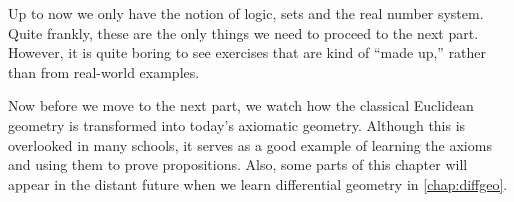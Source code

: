 \label{chap:basicgeo}

Up to now we only have the notion of
logic,
sets
and the real number system.
Quite frankly,
these are the only things we need
to proceed to the next part.
However,
it is quite boring to see exercises that are kind of ``made up,''
rather than from real-world examples.

Now before we move to the next part,
we watch how the classical Euclidean geometry
is transformed into today's axiomatic geometry.
Although this is overlooked in many schools,
it serves as a good example of
learning the axioms and using them to prove propositions.
Also, some parts of this chapter
will appear in the distant future
when we learn differential geometry in \cref{chap:diffgeo}.